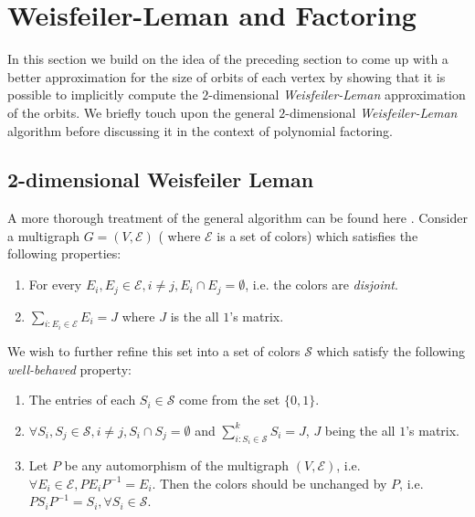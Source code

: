 \section{Weisfeiler-Leman and Factoring}\label{sec:weisfeiler}

In this section we build on the idea of the preceding section to come up with a better approximation for the size of orbits of each vertex by showing that it is possible to implicitly compute the $2$-dimensional 
\emph{Weisfeiler-Leman} approximation of the orbits. We briefly touch upon the general $2$-dimensional \emph{Weisfeiler-Leman} algorithm before discussing it in the context of polynomial factoring.

\subsection{2-dimensional Weisfeiler Leman}
A more thorough treatment of the general algorithm can be found here \cite{barbados}. Consider a multigraph $G=(V,\mathcal{E})$ ( where $\mathcal{E}$ is a set of colors) which satisfies the following properties:

  \begin{enumerate}
	  \item For every $E_i,E_j \in \mathcal{E},i\neq j, E_i \cap E_j = 
	  \emptyset$, i.e. the colors are \emph{disjoint}.

	  \item $\displaystyle\sum_{i:E_i\in \mathcal{E}} E_i = J$ where $J$ is the all $1$'s matrix.

  \end{enumerate}

  We wish to further refine this set into a set of colors $\mathcal{S}$ which satisfy the following \emph{well-behaved} property:

 \begin{enumerate}
	 \item The entries of each $S_i \in \mathcal{S}$ come from the set $\{0,1\}$.

	 \item $\forall S_i,S_j \in \mathcal{S}, i \neq j, S_i \cap S_j = \emptyset$
	  and $\displaystyle\sum_{i:S_i\in \mathcal{S}}^k S_i =J$, $J$ being the all $1$'s matrix.

	 
	 \item Let $P$ be any automorphism of the multigraph $(V,\mathcal{E})$, i.e. $\forall E_i \in \mathcal{E}, PE_iP^{-1}=E_i$. Then the colors should be unchanged by $P$, i.e. $PS_iP^{-1}=S_i,\forall S_i \in \mathcal{S}$.
		 
 \end{enumerate}

